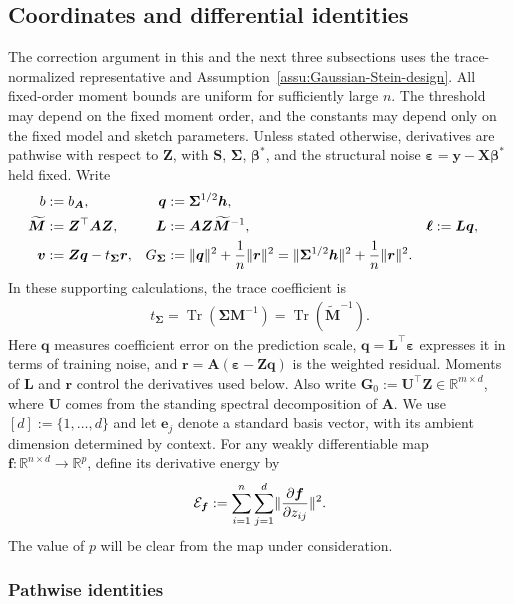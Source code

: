 \documentclass{article}
\theoremstyle{plain}
\theoremstyle{definition}
\theoremstyle{definition}
\DeclarePairedDelimiter\norm{\lVert}{\rVert}
\DeclareMathOperator{\trace}{Tr}
\def\R{{\mathbb{R}}}
\def\mathbold{\boldsymbol}
\def\cal{\mathcal}
\def\bA{\mathbold{A}}\def\calA{{\cal A}}\def\scrA{{\mathscr A}}\def\Ahat{\widehat{A}}\def\Atil{{\widetilde A}}
\def\bff{\mathbold{f}}\def\fhat{\widehat{f}}\def\hf{\widehat{f}}\def\ftil{\widetilde{f}}
\def\bG{\mathbold{G}}\def\calG{{\cal G}}\def\scrG{{\mathscr G}}\def\Ghat{\widehat{G}}\def\Gtil{{\widetilde G}}
\def\bh{\mathbold{h}}\def\hhat{\widehat{h}}\def\htil{\widetilde{h}}
\def\bell{\mathbold{\ell}}\def\ellhat{\widehat{\ell}}\def\elltil{\widetilde{\ell}}\def\ellbar{{\overline \ell}}
\def\bL{\mathbold{L}}\def\hbL{{\widehat{\bL}}}\def\tbL{{\widetilde{\bL}}}
\def\bM{\mathbold{M}}\def\hbM{{\widehat{\bM}}}\def\tbM{{\widetilde{\bM}}}
\def\bq{\mathbold{q}}\def\qhat{\widehat{q}}\def\qtil{\widetilde{q}}\def\qbar{{\overline q}}
\def\br{\mathbold{r}}\def\rhat{\widehat{r}}\def\rtil{\widetilde{r}}\def\rbar{{\overline r}}
\def\bS{\mathbold{S}}\def\hbS{{\widehat{\bS}}}\def\tbS{{\widetilde{\bS}}}
\def\be{\mathbold{e}}
\def\bU{\mathbold{U}}\def\hbU{{\widehat{\bU}}}\def\tbU{{\widetilde{\bU}}}
\def\bv{\mathbold{v}}\def\vhat{\widehat{v}}\def\vtil{\widetilde{v}}\def\vbar{{\overline v}}
\def\bX{\mathbold{X}}\def\hbX{{\widehat{\bX}}}\def\tbX{{\tilde{\bX}}}\def\bXbar{{\overline \bX}}
\def\by{\mathbold{y}}\def\yhat{\widehat{y}}\def\ytil{\widetilde{y}}\def\ybar{{\overline y}}\def\vby{{\bf y}}
\def\bZ{\mathbold{Z}}\def\hbZ{{\widehat{\bZ}}}\def\tbZ{{\widetilde{\bZ}}}
\def\bbeta{\mathbold{\beta}}\def\betahat{\widehat{\beta}}\def\hbeta{\widehat{\beta}}
\def\ep{\varepsilon}\def\eps{\epsilon}\def\veps{\varepsilon}
\def\bep{ {\mathbold{\ep} }}
\def\bSigma{\mathbold{\Sigma}}\def\hbSigma{{\widehat{\bSigma}}}
\begin{document}
\subsection{Coordinates and differential identities}
\label{app:balanced-transfer-setup}
The correction argument in this and the next three subsections uses the
trace-normalized representative and
Assumption~\ref{assu:Gaussian-Stein-design}. All fixed-order moment bounds
are uniform for sufficiently large $n$. The threshold may depend on the
fixed moment order, and the constants may depend only on the fixed model
and sketch parameters. Unless stated otherwise, derivatives are
pathwise with respect to $\bZ$, with $\bS$, $\bSigma$, $\bbeta^*$, and
the structural noise $\bep=\by-\bX\bbeta^*$ held fixed. Write
\begin{align*}
    b&:=b_{\bA},
    & \bq&:=\bSigma^{1/2}\bh,\\
    \widetilde{\bM}&:=\bZ^\top\bA\bZ,
    & \bL&:=\bA\bZ\widetilde{\bM}^{-1},
    & \bell&:=\bL\bq,\\
    \bv&:=\bZ\bq-t_{\bSigma}\br,
    & G_{\bSigma}&:=\norm{\bq}^2+\frac{1}{n}\norm{\br}^2
      =\norm{\bSigma^{1/2}\bh}^2+\frac{1}{n}\norm{\br}^2.
\end{align*}
In these supporting calculations, the trace coefficient is
\begin{align*}
    t_{\bSigma}=\trace(\bSigma\bM^{-1})
       =\trace(\widetilde{\bM}^{-1}).
\end{align*}
Here $\bq$ measures coefficient error on the prediction scale,
$\bq=\bL^\top\bep$ expresses it in terms of training noise, and
$\br=\bA(\bep-\bZ\bq)$ is the weighted residual. Moments of $\bL$
and $\br$ control the derivatives used below. Also write
$\bG_0:=\bU^\top\bZ\in\R^{m\times d}$, where $\bU$ comes
from the standing spectral decomposition of $\bA$. We use
$[d]:=\{1,\ldots,d\}$ and let $\be_j$ denote a standard basis vector,
with its ambient dimension determined by context.
For any weakly differentiable map
$\bff:\R^{n\times d}\to\R^p$, define its derivative energy by
\begin{equation*}
    \calE_{\bff}:=\sum_{i=1}^n\sum_{j=1}^d
    \norm{\pdv{\bff}{z_{ij}}}^2.
\end{equation*}
The value of $p$ will be clear from the map under consideration.

\subsubsection{Pathwise identities}
\label{app:differential-proofs}
\end{document}
